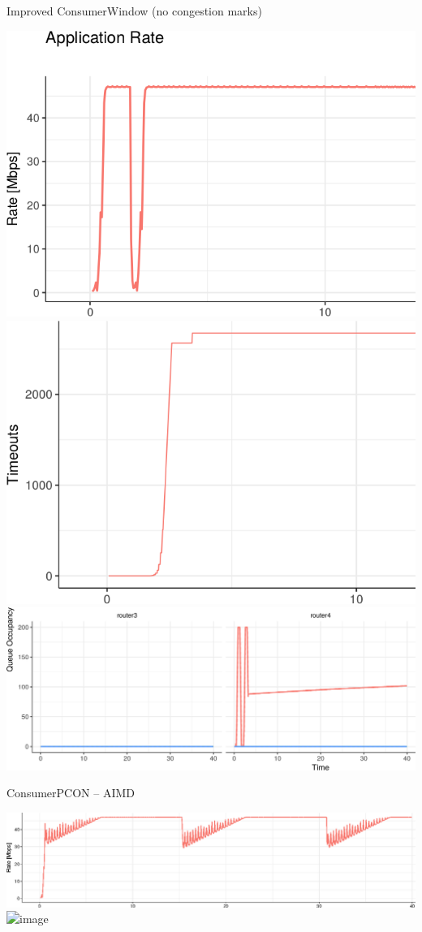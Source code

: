 \begin{frame}{Improved ConsumerWindow (no congestion marks)}

\includegraphics[width=0.48\linewidth]{figs/cons_new_rate.png}
\hspace{.1em}
\pause
\includegraphics[width=0.48\linewidth]{figs/cons_new_timeouts.png}\\
\pause
\includegraphics[width=\linewidth]{figs/cons_new_queue.png}

\end{frame}


\begin{frame}{ConsumerPCON -- AIMD}

\includegraphics[width=\linewidth]{figs/cons_pcon_rate.png}\\
\pause
\includegraphics<1-2>[width=\linewidth]{figs/cons_pcon_queue.png}

\end{frame}


